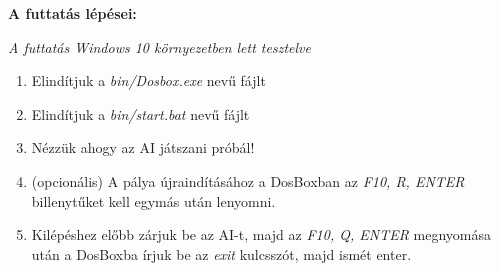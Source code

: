 
\textbf{A futtatás lépései:}

\textit{A futtatás Windows 10 környezetben lett tesztelve}

\begin{enumerate}
    \item Elindítjuk a \textit{bin/Dosbox.exe} nevű fájlt
    \item Elindítjuk a \textit{bin/start.bat} nevű fájlt
    \item Nézzük ahogy az AI játszani próbál!
    \item (opcionális) A pálya újraindításához a DosBoxban az \textit{F10, R, ENTER} billenytűket kell egymás után lenyomni.
    \item Kilépéshez előbb zárjuk be az AI-t, majd az \textit{F10, Q, ENTER} megnyomása után a DosBoxba írjuk be az \textit{exit} kulcsszót, majd ismét enter.
\end{enumerate}
